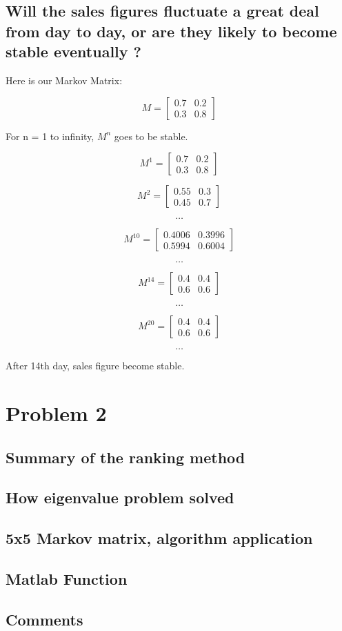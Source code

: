 \documentclass[11pt]{article} %
\begin{document}
\subsection{Will the sales figures fluctuate a great deal from day to day, or are they likely to become stable eventually ?}

Here is our Markov Matrix:

$$ M = 
 \begin{bmatrix}
	0.7 & 0.2 \\ 0.3 & 0.8
 \end{bmatrix}
$$

For n =  1 to infinity, $ M^{n} $ goes to be stable.

$$ M^{1} = 
 \begin{bmatrix}
	0.7 & 0.2 \\ 0.3 & 0.8
 \end{bmatrix}
$$

$$ M^{2} = 
 \begin{bmatrix}
	0.55 & 0.3 \\ 0.45 & 0.7
 \end{bmatrix}
$$

$$\dots$$

$$ M^{10} = 
 \begin{bmatrix}
	0.4006 & 0.3996 \\ 0.5994 & 0.6004
 \end{bmatrix}
$$

$$\dots$$

$$ M^{14} = 
 \begin{bmatrix}
	0.4 & 0.4 \\ 0.6 & 0.6
 \end{bmatrix}
$$

$$\dots$$

$$ M^{20} = 
 \begin{bmatrix}
	0.4 & 0.4 \\ 0.6 & 0.6
 \end{bmatrix}
$$

$$\dots$$

After 14th day, sales figure become stable.






\section{Problem 2}


\subsection{Summary of the ranking method}


\subsection{How eigenvalue problem solved}


\subsection{5x5 Markov matrix, algorithm application}


\subsection{Matlab Function}


\subsection{Comments}
\end{document}
